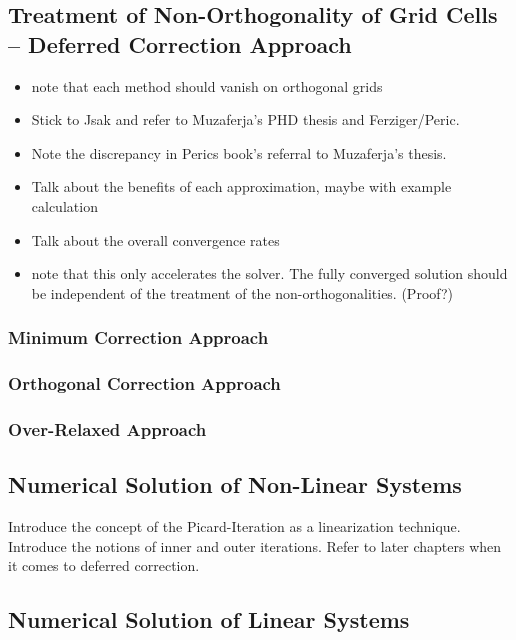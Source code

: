     \subsection{Treatment of Non-Orthogonality of Grid Cells -- Deferred Correction Approach}

    \begin{itemize}
      \item note that each method should vanish on orthogonal grids
      \item Stick to Jsak and refer to Muzaferja's PHD thesis and Ferziger/Peric. 
      \item Note the discrepancy in Perics book's referral to Muzaferja's thesis. 
      \item Talk about the benefits of each approximation, maybe with example calculation 
      \item Talk about the overall convergence rates
      \item note that this only accelerates the solver. The fully converged solution should be independent of the treatment of the non-orthogonalities. (Proof?)
    \end{itemize}

      \subsubsection{Minimum Correction Approach}
      \subsubsection{Orthogonal Correction Approach}
      \subsubsection{Over-Relaxed Approach}

    \subsection{Numerical Solution of Non-Linear Systems}

      Introduce the concept of the Picard-Iteration as a linearization technique. Introduce the notions of inner and outer iterations. Refer to later chapters when it comes to deferred correction.

    \subsection{Numerical Solution of Linear Systems}

